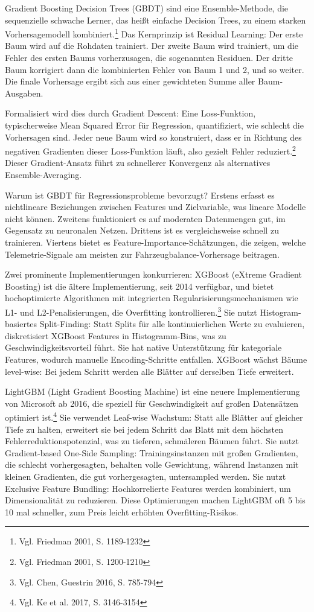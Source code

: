 Gradient Boosting Decision Trees (GBDT) sind eine Ensemble-Methode, die sequenzielle schwache Lerner, das heißt einfache Decision Trees, zu einem starken Vorhersagemodell kombiniert.\footnote{Vgl. Friedman 2001, S. 1189-1232} Das Kernprinzip ist Residual Learning: Der erste Baum wird auf die Rohdaten trainiert. Der zweite Baum wird trainiert, um die Fehler des ersten Baums vorherzusagen, die sogenannten Residuen. Der dritte Baum korrigiert dann die kombinierten Fehler von Baum 1 und 2, und so weiter. Die finale Vorhersage ergibt sich aus einer gewichteten Summe aller Baum-Ausgaben.

Formalisiert wird dies durch Gradient Descent: Eine Loss-Funktion, typischerweise Mean Squared Error für Regression, quantifiziert, wie schlecht die Vorhersagen sind. Jeder neue Baum wird so konstruiert, dass er in Richtung des negativen Gradienten dieser Loss-Funktion läuft, also gezielt Fehler reduziert.\footnote{Vgl. Friedman 2001, S. 1200-1210} Dieser Gradient-Ansatz führt zu schnellerer Konvergenz als alternatives Ensemble-Averaging.

Warum ist GBDT für Regressionsprobleme bevorzugt? Erstens erfasst es nichtlineare Beziehungen zwischen Features und Zielvariable, was lineare Modelle nicht können. Zweitens funktioniert es auf moderaten Datenmengen gut, im Gegensatz zu neuronalen Netzen. Drittens ist es vergleichsweise schnell zu trainieren. Viertens bietet es Feature-Importance-Schätzungen, die zeigen, welche Telemetrie-Signale am meisten zur Fahrzeugbalance-Vorhersage beitragen.

Zwei prominente Implementierungen konkurrieren: XGBoost (eXtreme Gradient Boosting) ist die ältere Implementierung, seit 2014 verfügbar, und bietet hochoptimierte Algorithmen mit integrierten Regularisierungsmechanismen wie L1- und L2-Penalisierungen, die Overfitting kontrollieren.\footnote{Vgl. Chen, Guestrin 2016, S. 785-794} Sie nutzt Histogram-basiertes Split-Finding: Statt Splits für alle kontinuierlichen Werte zu evaluieren, diskretisiert XGBoost Features in Histogramm-Bins, was zu Geschwindigkeitsvorteil führt. Sie hat native Unterstützung für kategoriale Features, wodurch manuelle Encoding-Schritte entfallen. XGBoost wächst Bäume level-wise: Bei jedem Schritt werden alle Blätter auf derselben Tiefe erweitert.

LightGBM (Light Gradient Boosting Machine) ist eine neuere Implementierung von Microsoft ab 2016, die speziell für Geschwindigkeit auf großen Datensätzen optimiert ist.\footnote{Vgl. Ke et al. 2017, S. 3146-3154} Sie verwendet Leaf-wise Wachstum: Statt alle Blätter auf gleicher Tiefe zu halten, erweitert sie bei jedem Schritt das Blatt mit dem höchsten Fehlerreduktionspotenzial, was zu tieferen, schmäleren Bäumen führt. Sie nutzt Gradient-based One-Side Sampling: Trainingsinstanzen mit großen Gradienten, die schlecht vorhergesagten, behalten volle Gewichtung, während Instanzen mit kleinen Gradienten, die gut vorhergesagten, untersampled werden. Sie nutzt Exclusive Feature Bundling: Hochkorrelierte Features werden kombiniert, um Dimensionalität zu reduzieren. Diese Optimierungen machen LightGBM oft 5 bis 10 mal schneller, zum Preis leicht erhöhten Overfitting-Risikos.

